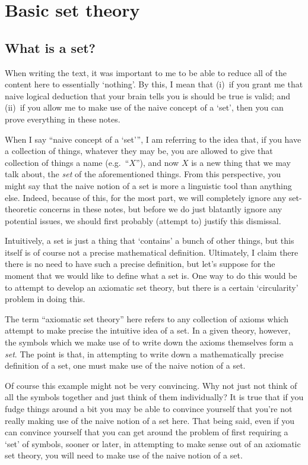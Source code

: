 \chapter{Basic set theory}

\section{What is a set?}\label{sbsA.1.1}

When writing the text, it was important to me to be able to reduce all of the content here to essentially `nothing'.  By this, I mean that (i)~if you grant me that naive logical deduction that your brain tells you is should be true is valid; and (ii)~if you allow me to make use of the naive concept of a `set', then you can prove everything in these notes.

When I say ``naive concept of a `set'{}'', I am referring to the idea that, if you have a collection of things, whatever they may be, you are allowed to give that collection of things a name (e.g.~``$X$''), and now $X$ is a new thing that we may talk about, the \emph{set} of the aforementioned things.  From this perspective, you might say that the naive notion of a set is more a linguistic tool than anything else.  Indeed, because of this, for the most part, we will completely ignore any set-theoretic concerns in these notes, but before we do just blatantly ignore any potential issues, we should first probably (attempt to) justify this dismissal.

Intuitively, a set is just a thing that `contains' a bunch of other things, but this itself is of course not a precise mathematical definition.  Ultimately, I claim there there is no need to have such a precise definition, but let's suppose for the moment that we would like to define what a set is.  One way to do this would be to attempt to develop an axiomatic set theory, but there is a certain `circularity' problem in doing this.

The term ``axiomatic set theory'' here refers to any collection of axioms which attempt to make precise the intuitive idea of a set.  In a given theory, however, the symbols which we make use of to write down the axioms themselves form a \emph{set}.  The point is that, in attempting to write down a mathematically precise definition of a set, one must make use of the naive notion of a set.

Of course this example might not be very convincing.  Why not just not think of all the symbols together and just think of them individually?  It is true that if you fudge things around a bit you may be able to convince yourself that you're not really making use of the naive notion of a set here.  That being said, even if you can convince yourself that you can get around the problem of first requiring a `set' of symbols, sooner or later, in attempting to make sense out of an axiomatic set theory, you will need to make use of the naive notion of a set.

